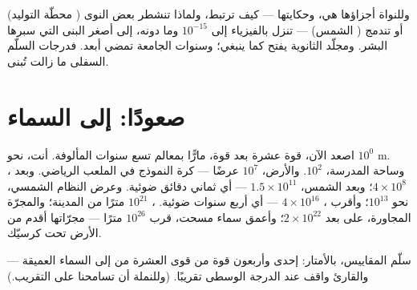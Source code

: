 \begin{example}\label{ex:g9:atoms-to-galaxies:deeper}
وللنواة أجزاؤها هي، وحكايتها --- كيف ترتبط، ولماذا تنشطر بعض
النوى ( محطّة التوليد) أو تندمج ( الشمس) --- تنزل
بالفيزياء إلى $10^{-15}$  وما دونه، إلى أصغر البنى التي
سبرها البشر. ومجلّد الثانوية يفتح  كما ينبغي؛ وسنوات
الجامعة تمضي أبعد. فدرجات السلّم السفلى ما زالت تُبنى.
\end{example}

\section{صعودًا: إلى السماء}

\begin{example}[الصعود]\label{ex:g9:atoms-to-galaxies:ascent}
اصعد الآن، قوة عشرة بعد قوة، مارًّا بمعالم تسع سنوات المألوفة.
أنت، نحو $10^{0}$ \unit{m}. وساحة المدرسة، $10^{2}$. والأرض،
$10^{7}$ عرضًا --- كرة النموذج في الملعب الرياضي. وبعد ،
$4 \times 10^{8}$؛ وبعد الشمس، $1.5 \times 10^{11}$ --- أي
ثماني دقائق ضوئية. وعرض النظام الشمسي، نحو $10^{13}$؛ وأقرب
، $4 \times 10^{16}$ --- أي أربع سنوات ضوئية. ، $10^{21}$ مترًا من المدينة؛ والمجرّة المجاورة، على
بعد $2 \times 10^{22}$؛ وأعمق سماء مسحت، قرب $10^{26}$ مترًا
---  مجرّاتها أقدم من الأرض تحت كرسيّك.
\end{example}

\begin{omfigure}

{\small سلّم المقاييس، بالأمتار: إحدى وأربعون قوة من قوى
العشرة من  إلى السماء العميقة --- والقارئ واقف عند
الدرجة الوسطى تقريبًا. (وللنملة أن تسامحنا على التقريب.)}
\end{omfigure}

